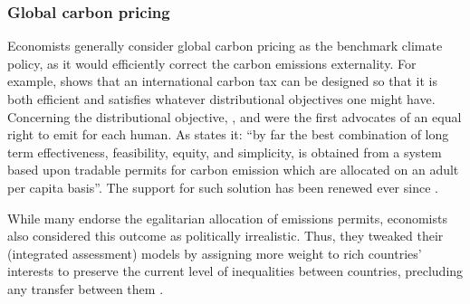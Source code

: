\subsubsection{Global carbon pricing}\label{subsubsec:literature_pricing}

Economists generally consider global carbon pricing as the benchmark climate policy, as it would efficiently correct the carbon emissions externality. For example, \citet{hoel_carbon_1991} shows that an international carbon tax can be designed so that it is both efficient and satisfies whatever distributional objectives one might have. 
Concerning the distributional objective, \citet{grubb_greenhouse_1990}, \citet{agarwal_global_1991} and \citet{bertram_tradeable_1992} were the first advocates of an equal right to emit for each human. As \citet{grubb_greenhouse_1990} states it: ``by far the best combination of long term effectiveness, feasibility, equity, and simplicity, is obtained from a system based upon tradable permits for carbon emission which are allocated on an adult per capita basis''. The support for such solution has been renewed ever since \citep{baer_equity_2000,jamieson_climate_2001,blanchard_major_2021,rajan_global_2021}. 

While many endorse the egalitarian allocation of emissions permits, economists also considered this outcome as politically irrealistic. Thus, they tweaked their (integrated assessment) models by assigning more weight to rich countries' interests to preserve the current level of inequalities between countries, precluding any transfer between them \citep{stanton_negishi_2011}. 

